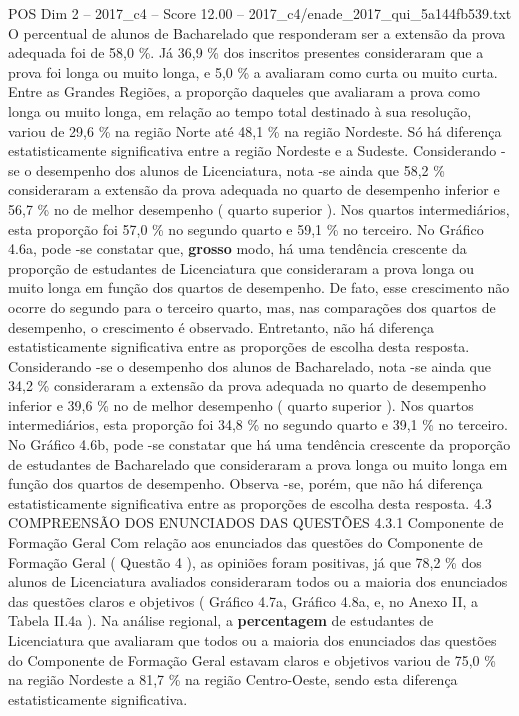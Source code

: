\begin{textsample}{POS Dim 2 – 2017\_c4 – Score 12.00 – 2017\_c4/enade\_2017\_qui\_5a144fb539.txt}
O percentual de alunos de Bacharelado que responderam ser a extensão da prova adequada foi de 58,0 \%.
Já 36,9 \% dos inscritos presentes consideraram que a prova foi longa ou muito longa, e 5,0 \% a avaliaram como curta ou muito curta.
Entre as Grandes Regiões, a proporção daqueles que avaliaram a prova como longa ou muito longa, em relação ao tempo total destinado à sua resolução, variou de 29,6 \% na região Norte até 48,1 \% na região Nordeste.
Só há diferença estatisticamente significativa entre a região Nordeste e a Sudeste.
Considerando -se o desempenho dos alunos de Licenciatura, nota -se ainda que 58,2 \% consideraram a extensão da prova adequada no quarto de desempenho inferior e 56,7 \% no de melhor desempenho ( quarto superior ).
Nos quartos intermediários, esta proporção foi 57,0 \% no segundo quarto e 59,1 \% no terceiro.
No Gráfico 4.6a, pode -se constatar que, \textbf{grosso} modo, há uma tendência crescente da proporção de estudantes de Licenciatura que consideraram a prova longa ou muito longa em função dos quartos de desempenho.
De fato, esse crescimento não ocorre do segundo para o terceiro quarto, mas, nas comparações dos quartos de desempenho, o crescimento é observado.
Entretanto, não há diferença estatisticamente significativa entre as proporções de escolha desta resposta.
Considerando -se o desempenho dos alunos de Bacharelado, nota -se ainda que 34,2 \% consideraram a extensão da prova adequada no quarto de desempenho inferior e 39,6 \% no de melhor desempenho ( quarto superior ).
Nos quartos intermediários, esta proporção foi 34,8 \% no segundo quarto e 39,1 \% no terceiro.
No Gráfico 4.6b, pode -se constatar que há uma tendência crescente da proporção de estudantes de Bacharelado que consideraram a prova longa ou muito longa em função dos quartos de desempenho.
Observa -se, porém, que não há diferença estatisticamente significativa entre as proporções de escolha desta resposta. 4.3 COMPREENSÃO DOS ENUNCIADOS DAS QUESTÕES 4.3.1 Componente de Formação Geral Com relação aos enunciados das questões do Componente de Formação Geral ( Questão 4 ), as opiniões foram positivas, já que 78,2 \% dos alunos de Licenciatura avaliados consideraram todos ou a maioria dos enunciados das questões claros e objetivos ( Gráfico 4.7a, Gráfico 4.8a, e, no Anexo II, a Tabela II.4a ).
Na análise regional, a \textbf{percentagem} de estudantes de Licenciatura que avaliaram que todos ou a maioria dos enunciados das questões do Componente de Formação Geral estavam claros e objetivos variou de 75,0 \% na região Nordeste a 81,7 \% na região Centro-Oeste, sendo esta diferença estatisticamente significativa.

\end{textsample}
